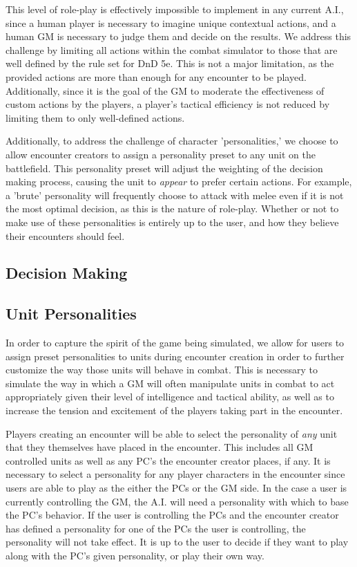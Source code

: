 \documentclass[12pt,a4paper]{report}
\begin{document}
		 This level of role-play is effectively impossible to implement in any current A.I., since a human player is necessary to imagine unique contextual actions, and a human GM is necessary to judge them and decide on the results. We address this challenge by limiting all actions within the combat simulator to those that are well defined by the rule set for DnD 5e. This is not a major limitation, as the provided actions are more than enough for any encounter to be played. Additionally, since it is the goal of the GM to moderate the effectiveness of custom actions by the players, a player's tactical efficiency is not reduced by limiting them to only well-defined actions. 

		Additionally, to address the challenge of character 'personalities,' we choose to allow encounter creators to assign a personality preset to any unit on the battlefield. This personality preset will adjust the weighting of the decision making process, causing the unit to \textit{appear} to prefer certain actions. For example, a 'brute' personality will frequently choose to attack with melee even if it is not the most optimal decision, as this is the nature of role-play. Whether or not to make use of these personalities is entirely up to the user, and how they believe their encounters should feel. 
		
		\subsection{Decision Making}
		
		\subsection{Unit Personalities}
		In order to capture the spirit of the game being simulated, we allow for users to assign preset personalities to units during encounter creation in order to further customize the way those units will behave in combat. This is necessary to simulate the way in which a GM will often manipulate units in combat to act appropriately given their level of intelligence and tactical ability, as well as to increase the tension and excitement of the players taking part in the encounter. 
		
		Players creating an encounter will be able to select the personality of \textit{any} unit that they themselves have placed in the encounter. This includes all GM controlled units as well as any PC's the encounter creator places, if any. It is necessary to select a personality for any player characters in the encounter since users are able to play as the either the PCs or the GM side. In the case a user is currently controlling the GM, the A.I. will need a personality with which to base the PC's behavior. If the user is controlling the PCs and the encounter creator has defined a personality for one of the PCs the user is controlling, the personality will not take effect. It is up to the user to decide if they want to play along with the PC's given personality, or play their own way. 
		
\end{document}
